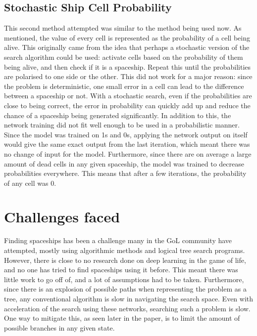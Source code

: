 \documentclass{l4proj}
\begin{document}
\subsection {Stochastic Ship Cell Probability}

This second method attempted was similar to the method being used now. As mentioned, the value of every cell is represented as the probability of a cell being alive. This originally came from the idea that perhaps a stochastic version of the search algorithm could be used: activate cells based on the probability of them being alive, and then check if it is a spaceship. Repeat this until the probabilities are polarised to one side or the other. This did not work for a major reason: since the problem is deterministic, one small error in a cell can lead to the difference between a spaceship or not. With a stochastic search, even if the probabilities are close to being correct, the error in probability can quickly add up and reduce the chance of a spaceship being generated significantly. In addition to this, the network training did not fit well enough to be used in a probabilistic manner. Since the model was trained on 1s and 0s, applying the network output on itself would give the same exact output from the last iteration, which meant there was no change of input for the model. Furthermore, since there are on average a large amount of dead cells in any given spaceship, the model was trained to decrease probabilities everywhere. This means that after a few iterations, the probability of any cell was 0.

\section{Challenges faced}

Finding spaceships has been a challenge many in the GoL community have attempted, mostly using algorithmic methods and logical tree search programs. However, there is close to no research done on deep learning in the game of life, and no one has tried to find spaceships using it before. This meant there was little work to go off of, and a lot of assumptions had to be taken. Furthermore, since there is an explosion of possible paths when representing the problem as a tree, any conventional algorithm is slow in navigating the search space. Even with acceleration of the search using these networks, searching such a problem is slow. One way to mitigate this, as seen later in the paper, is to limit the amount of possible branches in any given state. 
\end{document}
